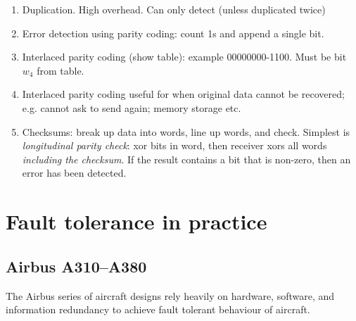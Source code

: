 \documentclass[11pt]{article}
\begin{document}
\begin{enumerate}

 \item Duplication. High overhead. Can only detect (unless duplicated twice)

 \item Error detection using parity coding: count 1s and append a single bit.

 \item Interlaced parity coding (show table): example 00000000-1100. Must be bit $w_4$ from table. 

 \item Interlaced parity coding useful for when original data cannot be recovered; e.g. cannot ask to send again; memory storage etc.

 \item Checksums: break up data into words, line up words, and check. Simplest is  \emph{longitudinal parity check}: xor bits in word, then receiver xors  all words \emph{including the checksum}. If the result contains a bit that is non-zero, then an error has been detected.



\end{enumerate}

\pagebreak

\section*{Fault tolerance in practice}

\subsection*{Airbus A310--A380}

The Airbus series of aircraft designs rely heavily on hardware, software, and information redundancy to achieve fault tolerant behaviour of aircraft. 
\end{document}
